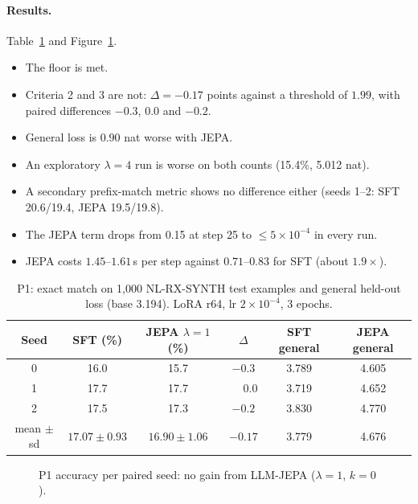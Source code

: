 \documentclass[11pt]{article}
\begin{document}
\paragraph{Results.} Table~\ref{tab:p1} and Figure~\ref{fig:p1}.
\begin{itemize}
\item The floor is met.
\item Criteria 2 and 3 are not: $\Delta=-0.17$ points against a threshold of $1.99$, with paired differences $-0.3$,
$0.0$ and $-0.2$.
\item General loss is $0.90$ nat worse with JEPA.
\item An exploratory $\lambda=4$ run is worse on both counts (15.4\%, 5.012 nat).
\item A secondary prefix-match metric shows no difference either (seeds 1--2: SFT 20.6/19.4, JEPA 19.5/19.8).
\item The JEPA term drops from 0.15 at step 25 to $\le5\times10^{-4}$ in every run.
\item JEPA costs $1.45$--$1.61$\,s per step against $0.71$--$0.83$ for SFT (about $1.9\times$).
\end{itemize}

\begin{table}[t]
\centering
\caption{P1: exact match on 1{,}000 NL-RX-SYNTH test examples and general held-out loss (base 3.194). LoRA r64, lr
$2\times10^{-4}$, 3 epochs.}
\label{tab:p1}
\begin{tabular}{cccccc}
\toprule
Seed & SFT (\%) & JEPA $\lambda{=}1$ (\%) & $\Delta$ & SFT general & JEPA general\\
\midrule
0 & 16.0 & 15.7 & $-0.3$ & 3.789 & 4.605\\
1 & 17.7 & 17.7 & $\phantom{-}0.0$ & 3.719 & 4.652\\
2 & 17.5 & 17.3 & $-0.2$ & 3.830 & 4.770\\
\midrule
mean $\pm$ sd & $17.07\pm0.93$ & $16.90\pm1.06$ & $-0.17$ & 3.779 & 4.676\\
\bottomrule
\end{tabular}
\end{table}

\begin{figure}[t]
\centering
{}
\caption{P1 accuracy per paired seed: no gain from LLM-JEPA ($\lambda=1$, $k=0$).}
\label{fig:p1}
\end{figure}
\end{document}
